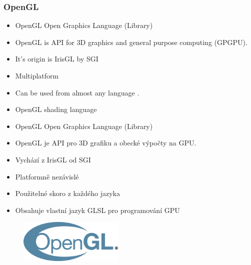 
\begin{frame}\frametitle{OpenGL}
\scriptsize
\begin{itemize}
\item OpenGL Open Graphics Language (Library) 
\item OpenGL is API for 3D graphics and general purpose computing (GPGPU).
\item It's origin is IrisGL by SGI
\item Multiplatform
\item Can be used from almost any language .
\item OpenGL shading language
\end{itemize}

\begin{itemize}
\item OpenGL Open Graphics Language (Library) 
\item OpenGL je API pro 3D grafiku a obecké výpočty na GPU.
\item Vychází z IrisGL od SGI 
\item Platformně nezávislé 
\item Použitelné skoro z každého jazyka 
\item Obsahuje vlastní jazyk GLSL pro programování GPU
\end{itemize}
  \begin{figure}[h]
  \includegraphics[width=5cm,keepaspectratio]{pics/opengl/logo}
  \end{figure}
\end{frame}

